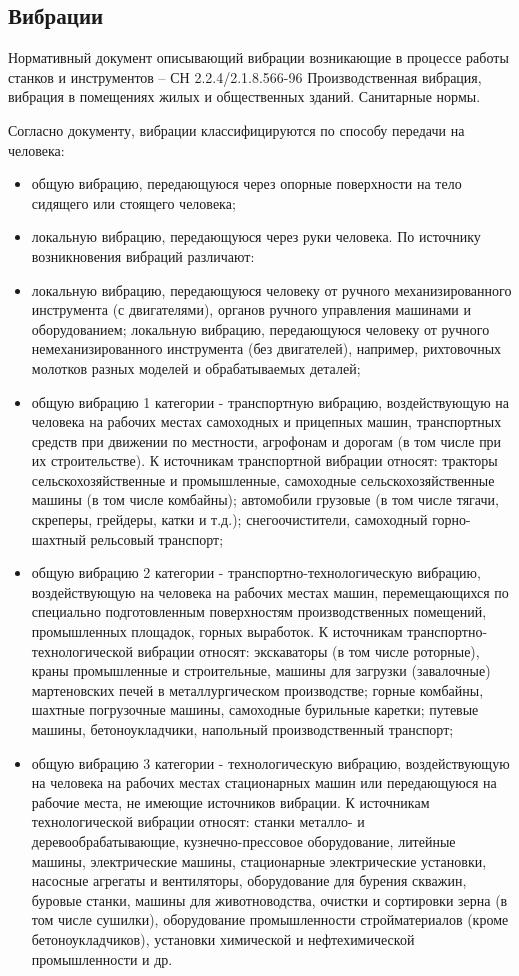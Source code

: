 \subsection{Вибрации}
Нормативный документ описывающий вибрации возникающие в процессе работы станков и инструментов – СН 2.2.4/2.1.8.566-96 Производственная вибрация, вибрация в помещениях жилых и общественных зданий. Санитарные нормы.

Согласно документу, вибрации классифицируются по способу передачи на человека:
\begin{itemize}
	\item общую вибрацию, передающуюся через опорные поверхности на тело сидящего или стоящего человека; 
	\item локальную вибрацию, передающуюся через руки человека.
По источнику возникновения вибраций различают:	
	\item локальную вибрацию, передающуюся человеку от ручного механизированного инструмента (с двигателями), органов ручного управления машинами и оборудованием;	
локальную вибрацию, передающуюся человеку от ручного немеханизированного инструмента (без двигателей), например, рихтовочных молотков разных моделей и обрабатываемых деталей; 
	\item общую вибрацию 1 категории - транспортную вибрацию, воздействующую на человека на рабочих местах самоходных и прицепных машин, транспортных средств при движении по местности, агрофонам и дорогам (в том числе при их строительстве). К источникам транспортной вибрации относят: тракторы сельскохозяйственные и промышленные, самоходные сельскохозяйственные машины (в том числе комбайны); автомобили грузовые (в том числе тягачи, скреперы, грейдеры, катки и т.д.); снегоочистители, самоходный горно-шахтный рельсовый транспорт;
	\item общую вибрацию 2 категории - транспортно-технологическую вибрацию, воздействующую на человека на рабочих местах машин, перемещающихся по специально подготовленным поверхностям производственных помещений, промышленных площадок, горных выработок. К источникам транспортно-технологической вибрации относят: экскаваторы (в том числе роторные), краны промышленные и строительные, машины для загрузки (завалочные) мартеновских печей в металлургическом производстве; горные комбайны, шахтные погрузочные машины, самоходные бурильные каретки; путевые машины, бетоноукладчики, напольный производственный транспорт;
	\item общую вибрацию 3 категории - технологическую вибрацию, воздействующую на человека на рабочих местах стационарных машин или передающуюся на рабочие места, не имеющие источников вибрации. К источникам технологической вибрации относят: станки металло- и деревообрабатывающие, кузнечно-прессовое оборудование, литейные машины, электрические машины, стационарные электрические установки, насосные агрегаты и вентиляторы, оборудование для бурения скважин, буровые станки, машины для животноводства, очистки и сортировки зерна (в том числе сушилки), оборудование промышленности стройматериалов (кроме бетоноукладчиков), установки химической и нефтехимической промышленности и др.
\end{itemize}

